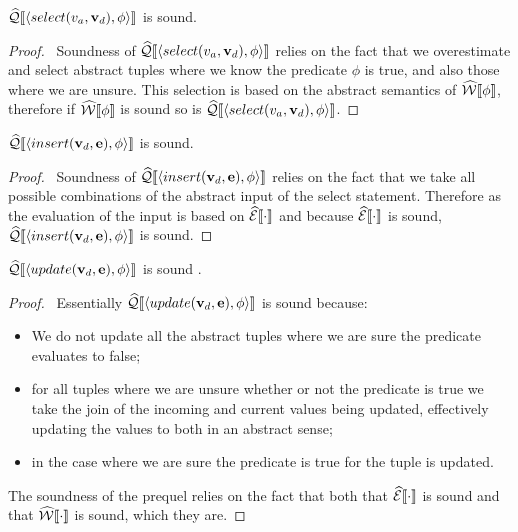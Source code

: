 \begin{conjecture}\label{thm:sound-select}
    $\widehat{\mathcal{Q}}\llbracket \langle select(v_a, \mathbf{v}_d), \phi \rangle \rrbracket$ is sound.
\end{conjecture}
\begin{proof}
    \pfsketch\
    Soundness of $\widehat{\mathcal{Q}}\llbracket \langle select(v_a, \mathbf{v}_d), \phi \rangle \rrbracket$ relies on the fact that we overestimate and select abstract tuples where we know the predicate $\phi$ is true, and also those where we are unsure.
    This selection is based on the abstract semantics of $\widehat{\mathcal{W}}\llbracket \phi \rrbracket$, therefore if $\widehat{\mathcal{W}}\llbracket \phi \rrbracket$ is sound so is $\widehat{\mathcal{Q}}\llbracket \langle select(v_a, \mathbf{v}_d), \phi \rangle \rrbracket$.
\end{proof}

\begin{conjecture}\label{thm:sound-insert}
    $\widehat{\mathcal{Q}}\llbracket \langle insert(\mathbf{v}_d, \mathbf{e}), \phi \rangle \rrbracket$ is sound.
\end{conjecture}
\begin{proof}
    \pfsketch\
    Soundness of $\widehat{\mathcal{Q}}\llbracket \langle insert(\mathbf{v}_d, \mathbf{e}), \phi \rangle \rrbracket$ relies on the fact that we take all possible combinations of the abstract input of the select statement.
    Therefore as the evaluation of the input is based on $\widehat{\mathcal{E}}\llbracket \cdot \rrbracket$ and because $\widehat{\mathcal{E}}\llbracket \cdot \rrbracket$ is sound, $\widehat{\mathcal{Q}}\llbracket \langle insert(\mathbf{v}_d, \mathbf{e}), \phi \rangle \rrbracket$ is sound.
\end{proof}

\begin{conjecture}\label{thm:sound-update}
    $\widehat{\mathcal{Q}}\llbracket \langle update(\mathbf{v}_d, \mathbf{e}), \phi \rangle \rrbracket$ is sound .
\end{conjecture}
\begin{proof}
    \pfsketch\
    Essentially $\widehat{\mathcal{Q}}\llbracket \langle update(\mathbf{v}_d, \mathbf{e}), \phi \rangle \rrbracket$ is sound because:
    \begin{itemize}
        \item We do not update all the abstract tuples where we are sure the predicate evaluates to false;
        \item for all tuples where we are unsure whether or not the predicate is true we take the join of the incoming and current values being updated, effectively updating the values to both in an abstract sense;
        \item in the case where we are sure the predicate is true for the tuple is updated.
    \end{itemize}
    The soundness of the prequel relies on the fact that both that $\widehat{\mathcal{E}}\llbracket \cdot \rrbracket$ is sound and that $\widehat{\mathcal{W}}\llbracket \cdot \rrbracket$ is sound, which they are.
\end{proof}

